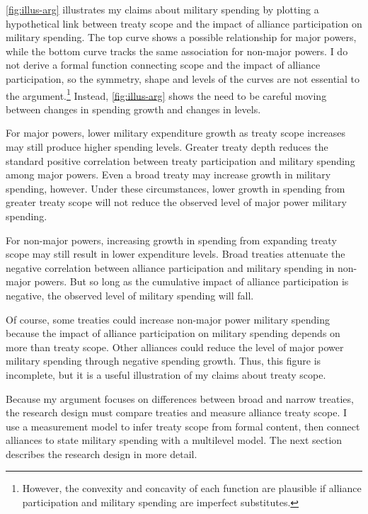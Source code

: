 \documentclass[12pt]{article}
\begin{document}
\autoref{fig:illus-arg} illustrates my claims about military spending by plotting a hypothetical link between treaty scope and the impact of alliance participation on military spending. 
The top curve shows a possible relationship for major powers, while the bottom curve tracks the same association for non-major powers. 
I do not derive a formal function connecting scope and the impact of alliance participation, so the symmetry, shape and levels of the curves are not essential to the argument.\footnote{However, the convexity and concavity of each function are plausible if alliance participation and military spending are imperfect substitutes.}  
Instead, \autoref{fig:illus-arg} shows the need to be careful moving between changes in spending growth and changes in levels. 


For major powers, lower military expenditure growth as treaty scope increases may still produce higher spending levels. 
Greater treaty depth reduces the standard positive correlation between treaty participation and military spending among major powers. 
Even a broad treaty may increase growth in military spending, however. 
Under these circumstances, lower growth in spending from greater treaty scope will not reduce the observed level of major power military spending. 


For non-major powers, increasing growth in spending from expanding treaty scope may still result in lower expenditure levels. 
Broad treaties attenuate the negative correlation between alliance participation and military spending in non-major powers. 
But so long as the cumulative impact of alliance participation is negative, the observed level of military spending will fall. 


Of course, some treaties could increase non-major power military spending because the impact of alliance participation on military spending depends on more than treaty scope. 
Other alliances could reduce the level of major power military spending through negative spending growth.
Thus, this figure is incomplete, but it is a useful illustration of my claims about treaty scope. 


Because my argument focuses on differences between broad and narrow treaties, the research design must compare treaties and measure alliance treaty scope.  
I use a measurement model to infer treaty scope from formal content, then connect alliances to state military spending with a multilevel model. 
The next section describes the research design in more detail. 
\end{document}
